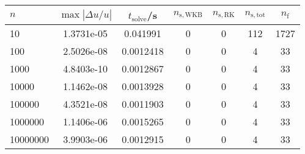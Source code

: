 \begin{tabular}{l c c c c c c}
\hline \hline 
$n$  &  $\max|\Delta u/u|$  &  $t_{\mathrm{solve}}$/\si{\s}  &  $n_{\mathrm{s,WKB}}$  &  $n_{\mathrm{s,RK}}$  &  $n_{\mathrm{s,tot}}$  &  $n_{\mathrm{f}}$ \\ \hline
10  &  1.3731e-05  &  0.041991  &  0  &  0  &  112  &  1727  \\ 
100  &  2.5026e-08  &  0.0012418  &  0  &  0  &  4  &  33  \\ 
1000  &  4.8403e-10  &  0.0012867  &  0  &  0  &  4  &  33  \\ 
10000  &  1.1462e-08  &  0.0013928  &  0  &  0  &  4  &  33  \\ 
100000  &  4.3521e-08  &  0.0011903  &  0  &  0  &  4  &  33  \\ 
1000000  &  1.1406e-06  &  0.0015265  &  0  &  0  &  4  &  33  \\ 
10000000  &  3.9903e-06  &  0.0012915  &  0  &  0  &  4  &  33  \\ 
\end{tabular}
